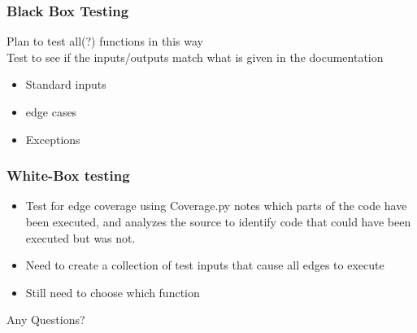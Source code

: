 \documentclass{beamer}
\begin{document}
\begin{frame}\frametitle{Black Box Testing} 
 Plan to test all(?) functions in this way\\
 Test to see if the inputs/outputs match what is given in the documentation
\begin{itemize}
\item Standard inputs
\item edge cases
\item Exceptions 

\end{itemize}
\end{frame}


\begin{frame}\frametitle{White-Box testing} 
\begin{itemize}
\item Test for edge coverage using Coverage.py
 notes which parts of the code have been executed, and analyzes the source to identify code that could have been executed but was not.
\item Need to create a collection of test inputs that cause all edges to execute
\item Still need to choose which function
\end{itemize}
\end{frame}

\begin{frame}
Any Questions?
\end{frame}
\end{document}
